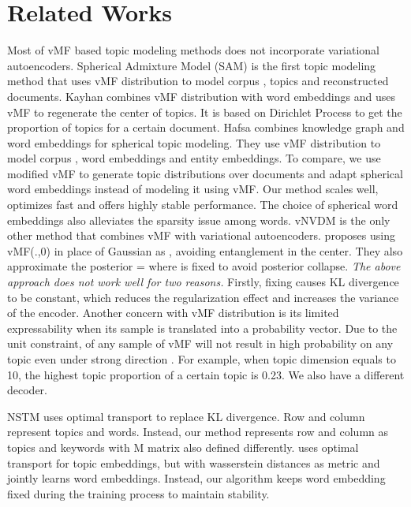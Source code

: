 \documentclass[11pt]{article}
\begin{document}
\section{Related Works}
\label{vMF}
Most of vMF based topic modeling methods does not incorporate variational autoencoders. Spherical Admixture Model (SAM) \cite{reisinger2010spherical} is the first topic modeling method that uses vMF distribution to model corpus , topics and reconstructed documents. Kayhan \cite{batmanghelich2016nonparametric} combines vMF distribution with word embeddings and uses vMF to regenerate the center of topics. It is based on Dirichlet Process to get the proportion of topics for a certain document. Hafsa \cite{9547420} combines knowledge graph and word embeddings for spherical topic modeling. They use vMF distribution to model corpus , word embeddings and entity embeddings. To compare, we use modified vMF to generate topic distributions over documents and adapt spherical word embeddings instead of modeling it using vMF. Our method scales well, optimizes fast and offers highly stable performance. The choice of spherical word embeddings also alleviates the sparsity issue among words. vNVDM \cite{xu2018spherical} is the only other method that combines vMF with variational autoencoders. \cite{xu2018spherical} proposes using vMF(.,0) in place of Gaussian as , avoiding entanglement in the center. They also approximate the posterior  =   where  is fixed to avoid posterior collapse. \textit{The above approach does not work well for two reasons.} Firstly, fixing  causes KL divergence to be constant, which reduces the regularization effect and increases the variance of the encoder.  Another concern with vMF distribution is its limited expressability when its sample is translated into a probability vector. Due to the unit constraint,  of any sample of vMF will not result in high probability on any topic even under strong direction . For example, when topic dimension  equals to 10, the highest topic proportion of a certain topic is 0.23. We also have a different decoder.


NSTM \cite{zhao2020neural} uses optimal transport to replace KL divergence. Row and column represent topics and words. Instead, our method represents row and column as topics and keywords with M matrix also defined differently. \cite{xu2018distilled} uses optimal transport for topic embeddings, but with wasserstein distances as metric and jointly learns word embeddings. Instead, our algorithm keeps word embedding fixed during the training process to maintain stability. 
\end{document}
